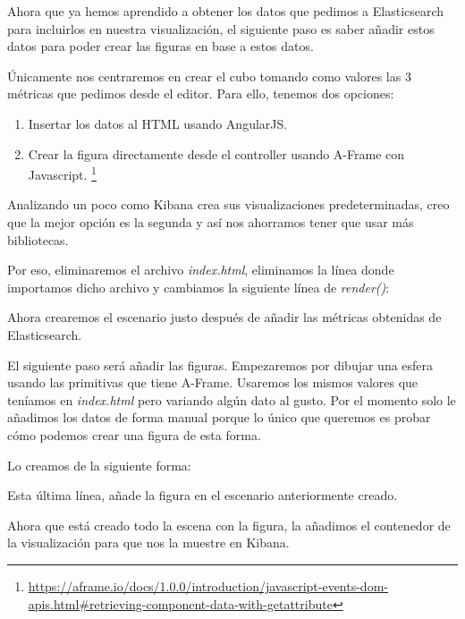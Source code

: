 \documentclass[a4paper, 12pt]{book}
\begin{document}
Ahora que ya hemos aprendido a obtener los datos que pedimos a Elasticsearch para incluirlos en nuestra visualización, el siguiente paso es saber añadir estos datos para poder crear las figuras en base a estos datos.

Únicamente nos centraremos en crear el cubo tomando como valores las 3 métricas que pedimos desde el editor. Para ello, tenemos dos opciones:

\begin{enumerate}
    \item Insertar los datos al HTML usando AngularJS.
    \item Crear la figura directamente desde el controller usando A-Frame con Javascript. \footnote{\url{https://aframe.io/docs/1.0.0/introduction/javascript-events-dom-apis.html#retrieving-component-data-with-getattribute}}
\end{enumerate}

Analizando un poco como Kibana crea sus visualizaciones predeterminadas, creo que la mejor opción es la segunda y así nos ahorramos tener que usar más bibliotecas.

Por eso, eliminaremos el archivo \textit{index.html}, eliminamos la línea donde importamos dicho archivo y cambiamos la siguiente línea de \textit{render()}:



Ahora crearemos el escenario justo después de añadir las métricas obtenidas de Elasticsearch.



El siguiente paso será añadir las figuras. Empezaremos por dibujar una esfera usando las primitivas que tiene A-Frame. Usaremos los mismos valores que teníamos en \textit{index.html} pero variando algún dato al gusto. Por el momento solo le añadimos los datos de forma manual porque lo único que queremos es probar cómo podemos crear una figura de esta forma.

Lo creamos de la siguiente forma:



Esta última línea, añade la figura en el escenario anteriormente creado.

Ahora que está creado todo la escena con la figura, la añadimos el contenedor de la visualización para que nos la muestre en Kibana.
\end{document}

